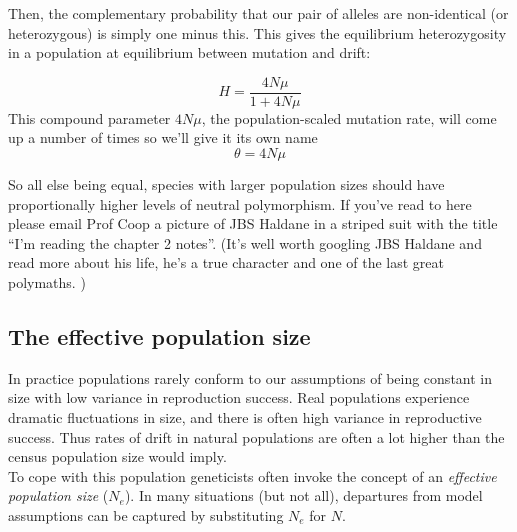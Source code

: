 Then, the complementary probability that our pair of alleles are non-identical
(or heterozygous) is simply one minus this. This gives the equilibrium
heterozygosity in a population at equilibrium between mutation and drift:

\begin{equation}
  H = \frac{4N\mu}{1+4N\mu} \label{eqn:hetero}
\end{equation}
This compound parameter $4N\mu$, the population-scaled mutation rate,
will come up a number of times so we'll give it its own name
\begin{equation}
\theta = 4N\mu
\end{equation}

So all else being equal, species with larger population sizes should
have proportionally higher levels of neutral polymorphism.  If you've read to here please email Prof Coop a picture of JBS Haldane
in a striped suit with the title ``I'm reading the chapter 2 notes''. (It's well worth googling JBS Haldane and read more about his life,
he's a true character and one of the last great polymaths. )

\subsection{The effective population size}

In practice populations rarely conform to our assumptions of being
constant in size with low variance in reproduction success. Real
populations experience dramatic fluctuations in size, and there is
often high variance in reproductive success. Thus rates of drift in
natural populations are often a lot higher than the census population
size would imply.\\

To cope with this population geneticists often invoke the concept of
an \emph{effective population size} ($N_e$). In many situations (but not all), departures from model assumptions can be captured by substituting $N_e$ for $N$.
\\


